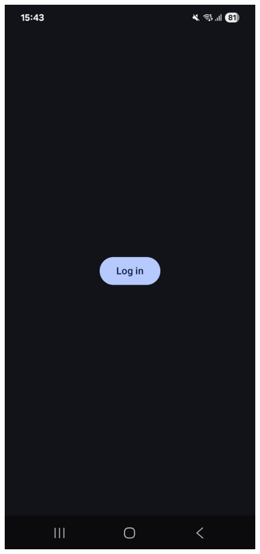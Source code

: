 \begin{figure}[H]
\centering
\begin{minipage}{0.32\textwidth}
    \centering
    \includegraphics[width=\textwidth]{english/figures/Screenshot_20250810_154333_Data Access Notifier.jpg}

\end{minipage}
\end{figure}
